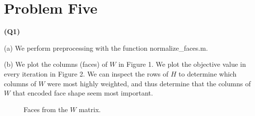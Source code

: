 

\section*{Problem Five}


\textbf{(Q1)}

(a) We perform preprocessing with the function normalize\_faces.m.

(b) We plot the columns (faces) of $W$ in Figure 1. We plot the objective value
in every iteration in Figure 2. We can inspect the rows of $H$ to determine
which columns of $W$ were most highly weighted, and thus determine that the
columns of $W$ that encoded face shape seem most important.

\begin{figure}[h!tbp]
        \caption{Faces from the $W$ matrix.}
\end{figure}

